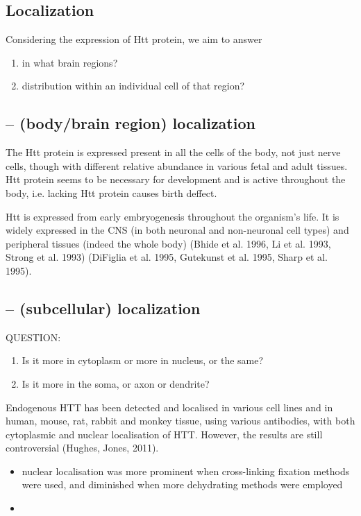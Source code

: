 \subsection{Localization}
\label{sec:HTT-protein-localization}

Considering the expression of Htt protein, we aim to answer
\begin{enumerate}
  \item in what brain regions?
  \item distribution within an individual cell of that region?
\end{enumerate}

\subsection{-- (body/brain region) localization}

The Htt protein is expressed present in all the cells of the body, not just
nerve cells, though with different relative abundance in various fetal and adult
tissues. Htt protein seems to be necessary for development and is active
throughout the body, i.e. lacking Htt protein causes birth deffect.

Htt is expressed from early embryogenesis throughout the organism's life.
It is widely expressed in the CNS (in both neuronal and non-neuronal cell types)
and peripheral tissues (indeed the whole body) (Bhide et al. 1996, Li et al.
1993, Strong et al. 1993) (DiFiglia et al. 1995,
Gutekunst et al. 1995, Sharp et al. 1995).

\subsection{-- (subcellular) localization}

QUESTION: 
\begin{enumerate}
  \item Is it more in cytoplasm or more in nucleus, or the same?
  \item Is it more in the soma, or axon or dendrite?
\end{enumerate}

Endogenous HTT has been detected and localised in various cell lines and in
human, mouse, rat, rabbit and monkey tissue, using various antibodies, with both
cytoplasmic and nuclear localisation of HTT. However, the results are still
controversial (Hughes, Jones, 2011).
\begin{itemize}

  \item  nuclear localisation was more prominent when cross-linking fixation
  methods were used, and diminished when more dehydrating methods were employed 
  
  \item 
\end{itemize}

